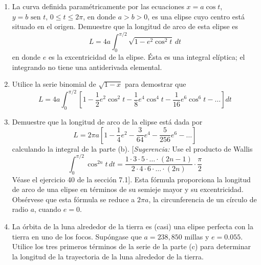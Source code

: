 \item 
    \begin{enumerate}
        \item La curva definida paramétricamente por las ecuaciones $x = a \cos t$, $y = b \text{ sen } t$, $0 \le t \le 2\pi$, en donde $a > b > 0$, es una elipse cuyo centro está situado en el origen. Demuestre que la longitud de arco de esta elipse es 
        \[
        L = 4a \int_0^{\pi/2} \sqrt{1 - e^2 \cos^2 t} \, dt
        \]
        en donde $e$ es la excentricidad de la elipse. Ésta es una integral elíptica; el integrando no tiene una antiderivada elemental.
        \item Utilice la serie binomial de $\sqrt{1 - x}$ para demostrar que
        \[
        L = 4a \int_0^{\pi/2} \left[ 1 - \frac{1}{2} e^2 \cos^2 t - \frac{1}{8} e^4 \cos^4 t - \frac{1}{16} e^6 \cos^6 t - \dots \right] dt
        \]
        \item Demuestre que la longitud de arco de la elipse está dada por
        \[
        L = 2\pi a \left[ 1 - \frac{1}{4} e^2 - \frac{3}{64} e^4 - \frac{5}{256} e^6 - \dots \right]
        \]
        calculando la integral de la parte (b). [\textit{Sugerencia:} Use el producto de Wallis
        \[
        \int_{0}^{\pi/2} \cos^{2n} t \, dt = \frac{1 \cdot 3 \cdot 5 \cdot \dots \cdot (2n-1)}{2 \cdot 4 \cdot 6 \cdot \dots \cdot (2n)} \cdot \frac{\pi}{2}
        \]
        Véase el ejercicio 40 de la sección 7.1]. Esta fórmula proporciona la longitud de arco de una elipse en términos de su semieje mayor y su excentricidad. Obsérvese que esta fórmula se reduce a $2\pi a$, la circunferencia de un círculo de radio $a$, cuando $e = 0$.
        \item La órbita de la luna alrededor de la tierra es (casi) una elipse perfecta con la tierra en uno de los focos. Supóngase que $a = 238,850$ millas y $e = 0.055$. Utilice los tres primeros términos de la serie de la parte (c) para determinar la longitud de la trayectoria de la luna alrededor de la tierra.
    \end{enumerate}
